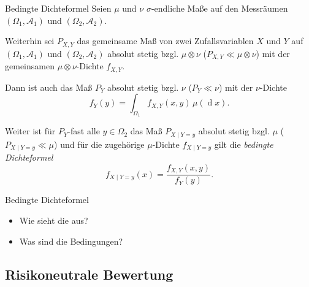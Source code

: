 \begin{defi}{Bedingte Dichteformel}
    Seien $\mu$ und $\nu$ $\sigma$-endliche Maße auf den Messräumen $(\Omega_1, \mathcal{A}_1)$ und $(\Omega_2, \mathcal{A}_2)$.

    Weiterhin sei $P_{X,Y}$ das gemeinsame Maß von zwei Zufallsvariablen $X$ und $Y$ auf $(\Omega_1, \mathcal{A}_1)$ und $(\Omega_2, \mathcal{A}_2)$ absolut stetig bzgl. $\mu \otimes \nu$ ($P_{X,Y} \ll \mu \otimes \nu$) mit der gemeinsamen $\mu \otimes \nu$-Dichte $f_{X,Y}$.

    Dann ist auch das Maß $P_Y$ absolut stetig bzgl. $\nu$ ($P_Y \ll \nu$) mit der $\nu$-Dichte
    \[
        f_Y(y) = \int_{\Omega_1} f_{X,Y}(x,y) \, \mu(\operatorname{d}x).
    \]

    Weiter ist für $P_Y$-fast alle $y \in \Omega_2$ das Maß $P_{X\mid Y=y}$ absolut stetig bzgl. $\mu$ ($P_{X\mid Y=y} \ll \mu$) und für die zugehörige $\mu$-Dichte $f_{X\mid Y=y}$ gilt die \emph{bedingte Dichteformel}
    \[
        f_{X\mid Y=y}(x) = \frac{f_{X,Y}(x,y)}{f_Y(y)}.
    \]
\end{defi}

\begin{info}{Bedingte Dichteformel}
    \begin{itemize}
        \item Wie sieht die aus?
        \item Was sind die Bedingungen?
    \end{itemize}
\end{info}

\subsection{Risikoneutrale Bewertung}

